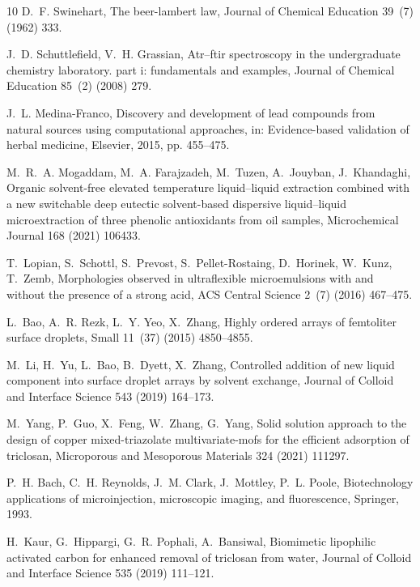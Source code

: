 \documentclass[a4paper,fleqn]{cas-dc}
\begin{document}
\begin{sloppypar}
\begin{thebibliography}{10}
D.~F. Swinehart, The beer-lambert law, Journal of Chemical Education 39~(7)
  (1962) 333.

J.~D. Schuttlefield, V.~H. Grassian, Atr--ftir spectroscopy in the
  undergraduate chemistry laboratory. part i: fundamentals and examples,
  Journal of Chemical Education 85~(2) (2008) 279.

J.~L. Medina-Franco, Discovery and development of lead compounds from natural
  sources using computational approaches, in: Evidence-based validation of
  herbal medicine, Elsevier, 2015, pp. 455--475.

M.~R.~A. Mogaddam, M.~A. Farajzadeh, M.~Tuzen, A.~Jouyban, J.~Khandaghi,
  Organic solvent-free elevated temperature liquid--liquid extraction combined
  with a new switchable deep eutectic solvent-based dispersive liquid--liquid
  microextraction of three phenolic antioxidants from oil samples,
  Microchemical Journal 168 (2021) 106433.

T.~Lopian, S.~Schottl, S.~Prevost, S.~Pellet-Rostaing, D.~Horinek, W.~Kunz,
  T.~Zemb, Morphologies observed in ultraflexible microemulsions with and
  without the presence of a strong acid, ACS Central Science 2~(7) (2016)
  467--475.

L.~Bao, A.~R. Rezk, L.~Y. Yeo, X.~Zhang, Highly ordered arrays of femtoliter
  surface droplets, Small 11~(37) (2015) 4850--4855.

M.~Li, H.~Yu, L.~Bao, B.~Dyett, X.~Zhang, Controlled addition of new liquid
  component into surface droplet arrays by solvent exchange, Journal of Colloid
  and Interface Science 543 (2019) 164--173.

M.~Yang, P.~Guo, X.~Feng, W.~Zhang, G.~Yang, Solid solution approach to the
  design of copper mixed-triazolate multivariate-mofs for the efficient
  adsorption of triclosan, Microporous and Mesoporous Materials 324 (2021)
  111297.

P.~H. Bach, C.~H. Reynolds, J.~M. Clark, J.~Mottley, P.~L. Poole, Biotechnology
  applications of microinjection, microscopic imaging, and fluorescence,
  Springer, 1993.

H.~Kaur, G.~Hippargi, G.~R. Pophali, A.~Bansiwal, Biomimetic lipophilic
  activated carbon for enhanced removal of triclosan from water, Journal of
  Colloid and Interface Science 535 (2019) 111--121.

\end{thebibliography}



\end{sloppypar}
\end{document}
